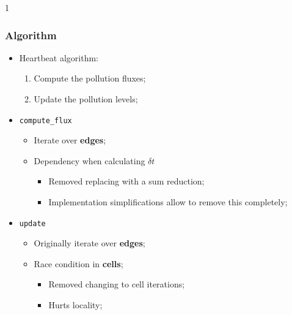 1\documentclass{beamer}
\begin{document}
\begin{frame}
	\frametitle{Algorithm}
	\begin{itemize}
		\item{Heartbeat algorithm:
		\begin{enumerate}
			\item{Compute the pollution fluxes;}
			\item{Update the pollution levels;}
		\end{enumerate}
		}
		\item{\texttt{compute\_flux}
		\begin{itemize}
			\item{Iterate over \textbf{edges};}
			\item{Dependency when calculating $\delta t$
			\begin{itemize}
				\item{Removed replacing with a sum reduction;}
				\item{Implementation simplifications allow to remove this completely;}
			\end{itemize}
			}
		\end{itemize}
		}
		\item{\texttt{update}
		\begin{itemize}
			\item{Originally iterate over \textbf{edges};}
			\item{Race condition in \textbf{cells};
			\begin{itemize}
				\item{Removed changing to cell iterations;}
				\item{Hurts locality;}
			\end{itemize}
			}
		\end{itemize}
		}
	\end{itemize}
\end{frame}
\end{document}
